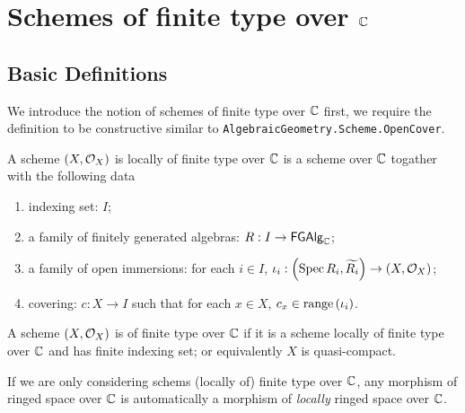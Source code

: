 \chapter{Schemes of finite type over $\mathbb{C}$}

\section{Basic Definitions}

We introduce the notion of schemes of finite type over $\mathbb{C}$ first, we require the definition to be constructive similar
to {\tt AlgebraicGeometry.Scheme.OpenCover}.

\begin{definition}
  \label{def:SchemeLocallyOfFiniteType}
  A scheme $\left(X, \mathcal{O}_{X}\right)$ is locally of finite type over $\mathbb{C}$ is a scheme over $\mathbb{C}$ togather
  with the following data
    \begin{enumerate}
        \item indexing set: $I$;
        \item a family of finitely generated algebras: $R : I \to \mathsf{FGAlg}_{\mathbb{C}}$;
        \item a family of open immersions: for each $i \in I$, $\iota_i: \left(\operatorname*{Spec}{R_i}, \widetilde{R_i}\right) \to \left(X, \mathcal{O}_{X}\right)$;
        \item covering: $c : X \to I$ such that for each $x \in X$, $c_x \in \operatorname*{range}\left({\iota_i}\right)$.
    \end{enumerate}
\end{definition}


\begin{definition}
  \label{def:SchemeOfFiniteType}
  A scheme $\left(X, \mathcal{O}_{X}\right)$ is of finite type over $\mathbb{C}$ if it is a scheme locally of finite type over $\mathbb{C}$
  and has finite indexing set; or equivalently $X$ is quasi-compact.
\end{definition}

\begin{remark}
  If we are only considering schems (locally of) finite type over $\mathbb{C}$, any morphism of ringed space over $\mathbb{C}$ is automatically a morphism of {\em locally} ringed space over $\mathbb{C}$.
\end{remark}


